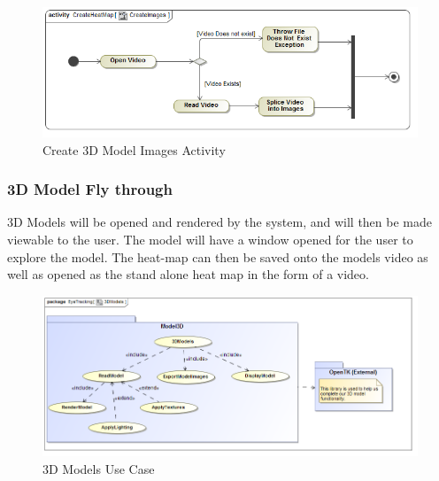 \begin{enumerate}
		\begin{figure}[!ht]
			\centering
			\includegraphics[scale=0.5,width=15cm,keepaspectratio]{Diagrams/Activity_Diagram__CreateHeatMap__CreateImages.png}
			\caption{Create 3D Model Images Activity}
		\end{figure}
	\end{enumerate}
	
	\subsubsection{3D Model Fly through}
	3D Models will be opened and rendered by the system, and will then be made viewable to the user. The model will have a window opened for the user to explore the model. The heat-map can then be saved onto the models video as well as opened as the stand alone heat map in the form of a video.
	\newline
	\begin{figure}[!ht]
		\centering
		\includegraphics[scale=0.5,width=15cm,keepaspectratio]{Diagrams/Use_Case_Diagram__3DModels.png}
		\caption{3D Models Use Case}
	\end{figure}
	
